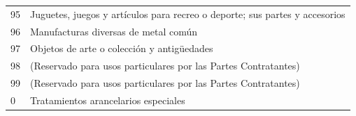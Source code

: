 \documentclass[a4paper,openright,12pt]{book}
\begin{document}
\begin{table}[]
{\begin{tabular}{@{}ll@{}}
95  & Juguetes, juegos y artículos para recreo o deporte; sus partes y accesorios                                                                                                                                                                                                                    \\
96  & Manufacturas diversas de metal común                                                                                                                                                                                                                                                           \\
97  & Objetos de arte o colección y antigüedades                                                                                                                                                                                                                                                     \\
98  & (Reservado para usos particulares por las Partes Contratantes)                                                                                                                                                                                                                                 \\
99  & (Reservado para usos particulares por las Partes Contratantes)                                                                                                                                                                                                                                 \\
0   & Tratamientos arancelarios especiales                                                                                                                                                                                                                                                           \\ \bottomrule
\end{tabular}%
}
\end{table}


\cleardoublepage
{}

\end{document}
